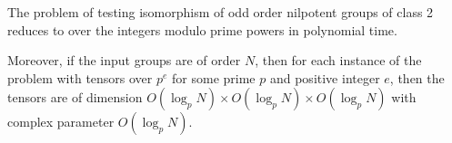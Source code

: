 \begin{theorem} \label{thm:GpI-to-AMSI}
The problem of testing isomorphism of odd order nilpotent groups of class 2 reduces to  over the integers modulo prime powers in polynomial time.

Moreover, if the input groups are of order $N$, then for each instance of the  problem with tensors over $p^e$ for some prime $p$ and positive integer $e$, 
then the tensors are of dimension $O(\log_p N) \times O(\log_p N) \times O(\log_p N)$ with complex parameter $O(\log_p N)$. %
\end{theorem}


